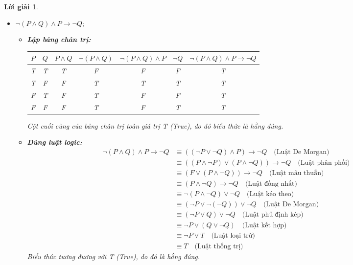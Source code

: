 \documentclass[11pt, oneside, a4paper]{article}
\newtheorem{loigiai}{Lời giải}[bt]
\begin{document}
\begin{loigiai}
\begin{itemize}
      \item[c)] $\lnot (P \land Q) \land P \rightarrow \lnot Q;$
        \begin{itemize}
            \item \textbf{Lập bảng chân trị:}
            \begin{center}
            \begin{tabular}{|c|c|c|c|c|c|c|}
            \hline
            $P$ & $Q$ & $P \land Q$ & $\lnot (P \land Q)$ & $\lnot (P \land Q) \land P$ & $\lnot Q$ & $\lnot (P \land Q) \land P \rightarrow \lnot Q$ \\
            \hline
            T & T & T & F & F & F & T \\
            T & F & F & T & T & T & T \\
            F & T & F & T & F & F & T \\
            F & F & F & T & F & T & T \\
            \hline
            \end{tabular}
            \end{center}
            Cột cuối cùng của bảng chân trị toàn giá trị T (True), do đó biểu thức là hằng đúng.
            \item \textbf{Dùng luật logic:}
            \begin{align*} \lnot (P \land Q) \land P \rightarrow \lnot Q &\equiv ((\lnot P \lor \lnot Q) \land P) \rightarrow \lnot Q \quad \text{(Luật De Morgan)} \\ &\equiv ((P \land \lnot P) \lor (P \land \lnot Q)) \rightarrow \lnot Q \quad \text{(Luật phân phối)} \\ &\equiv (F \lor (P \land \lnot Q)) \rightarrow \lnot Q \quad \text{(Luật mâu thuẫn)} \\ &\equiv (P \land \lnot Q) \rightarrow \lnot Q \quad \text{(Luật đồng nhất)} \\ &\equiv \lnot (P \land \lnot Q) \lor \lnot Q \quad \text{(Luật kéo theo)} \\ &\equiv (\lnot P \lor \lnot (\lnot Q)) \lor \lnot Q \quad \text{(Luật De Morgan)} \\ &\equiv (\lnot P \lor Q) \lor \lnot Q \quad \text{(Luật phủ định kép)} \\ &\equiv \lnot P \lor (Q \lor \lnot Q) \quad \text{(Luật kết hợp)} \\ &\equiv \lnot P \lor T \quad \text{(Luật loại trừ)} \\ &\equiv T \quad \text{(Luật thống trị)}\end{align*}
            Biểu thức tương đương với T (True), do đó là hằng đúng.
        \end{itemize}
    

\end{itemize}
\end{loigiai}
\end{document}
